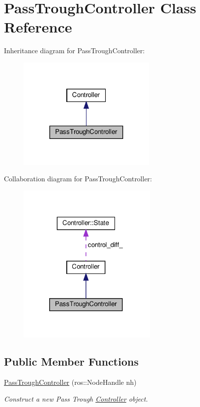 \hypertarget{classPassTroughController}{}\section{Pass\+Trough\+Controller Class Reference}
\label{classPassTroughController}


Inheritance diagram for Pass\+Trough\+Controller\+:\nopagebreak
\begin{figure}[H]
\begin{center}
\leavevmode
\includegraphics[width=191pt]{dc/de8/classPassTroughController__inherit__graph}
\end{center}
\end{figure}


Collaboration diagram for Pass\+Trough\+Controller\+:
\nopagebreak
\begin{figure}[H]
\begin{center}
\leavevmode
\includegraphics[width=193pt]{d5/d84/classPassTroughController__coll__graph}
\end{center}
\end{figure}
\subsection*{Public Member Functions}
\begin{DoxyCompactItemize}
\item 
\hyperlink{classPassTroughController_ab07ab9e0032dd1a46f3fd80726ce4b1f}{Pass\+Trough\+Controller} (ros\+::\+Node\+Handle nh)
\begin{DoxyCompactList}\small\item\em Construct a new Pass Trough \hyperlink{classController}{Controller} object. \end{DoxyCompactList}\end{DoxyCompactItemize}
